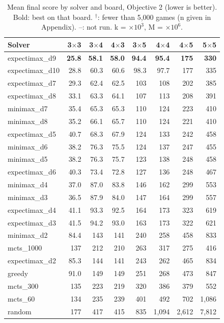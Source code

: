 \begin{table}[t]
\centering\small
\caption{Mean final score by solver and board, Objective 2 (lower is better). Bold: best on that board. $^\dagger$: fewer than 5{,}000 games (n given in Appendix). --: not run. k = $\times10^3$, M = $\times10^6$.}
\label{tab:mean_obj2}
\begin{tabular}{lrrrrrrr}
\toprule
Solver & 3$\times$3 & 3$\times$4 & 4$\times$3 & 3$\times$5 & 4$\times$4 & 4$\times$5 & 5$\times$5 \\
\midrule
expectimax\_d9 & \textbf{25.8} & \textbf{58.1} & \textbf{58.0} & \textbf{94.4} & \textbf{95.4} & \textbf{175} & \textbf{330} \\
expectimax\_d10 & 28.8 & 60.3 & 60.6 & 98.3 & 97.7 & 177 & 335 \\
expectimax\_d7 & 29.3 & 62.4 & 62.5 & 103 & 108 & 202 & 385 \\
expectimax\_d8 & 33.1 & 63.3 & 64.1 & 107 & 113 & 208 & 391 \\
minimax\_d7 & 35.4 & 65.3 & 65.3 & 110 & 124 & 223 & 410 \\
minimax\_d8 & 35.2 & 66.1 & 65.7 & 110 & 124 & 221 & 410 \\
expectimax\_d5 & 40.7 & 68.3 & 67.9 & 124 & 133 & 242 & 458 \\
minimax\_d6 & 38.2 & 76.3 & 75.5 & 124 & 137 & 247 & 455 \\
minimax\_d5 & 38.2 & 76.3 & 75.7 & 123 & 138 & 248 & 458 \\
expectimax\_d6 & 40.3 & 73.4 & 72.8 & 127 & 136 & 248 & 467 \\
minimax\_d4 & 37.0 & 87.0 & 83.8 & 146 & 162 & 299 & 553 \\
minimax\_d3 & 36.5 & 87.9 & 84.0 & 147 & 164 & 299 & 557 \\
expectimax\_d4 & 41.1 & 93.3 & 92.5 & 164 & 173 & 323 & 619 \\
expectimax\_d3 & 41.5 & 94.2 & 93.0 & 163 & 173 & 322 & 621 \\
minimax\_d2 & 84.4 & 143 & 141 & 240 & 258 & 458 & 833 \\
mcts\_1000 & 137 & 212 & 210 & 263 & 317 & 275 & 416 \\
expectimax\_d2 & 85.3 & 144 & 141 & 243 & 262 & 465 & 834 \\
greedy & 91.0 & 149 & 149 & 251 & 268 & 473 & 847 \\
mcts\_300 & 135 & 223 & 219 & 320 & 386 & 379 & 552 \\
mcts\_60 & 134 & 235 & 239 & 401 & 492 & 702 & 1{,}086 \\
random & 177 & 417 & 415 & 835 & 1{,}094 & 2{,}612 & 7{,}812 \\
\bottomrule
\end{tabular}
\end{table}